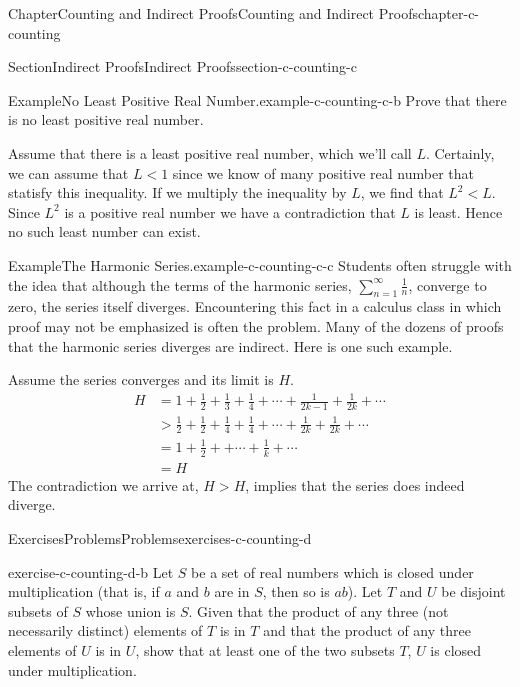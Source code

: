 \documentclass[oneside,10pt,]{book}
\numberwithin{equation}{section}
\newcommand{\lt}{<}
\newcommand{\gt}{>}
\begin{document}
\begin{chapterptx}{Chapter}{Counting and Indirect Proofs}{}{Counting and Indirect Proofs}{}{}{chapter-c-counting}
\begin{sectionptx}{Section}{Indirect Proofs}{}{Indirect Proofs}{}{}{section-c-counting-c}
\begin{example}{Example}{No Least Positive Real Number.}{example-c-counting-c-b}%
Prove that there is no least positive real number.%
\par
Assume that there is a least positive real number, which we'll call \(L\).  Certainly, we can assume that \(L \lt 1\) since we know of many positive real number that statisfy this inequality.  If we multiply the inequality by \(L\), we find that \(L^2 \lt L\).  Since \(L^2\) is a positive real number we have a contradiction that \(L\) is least.  Hence no such least number can exist.%
\end{example}
\begin{example}{Example}{The Harmonic Series.}{example-c-counting-c-c}%
%
Students often struggle with the idea that although the terms of the harmonic series, \(\sum_{n=1}^{\infty} \frac{1}{n}\), converge to zero, the series itself diverges. Encountering this fact in a calculus class in which proof may not be emphasized is often the problem.  Many of the dozens of proofs that the harmonic series diverges are indirect.  Here is one such example.%
\par
Assume the series converges and its limit is \(H\).%
\begin{equation*}
\begin{split}
H &= 1 + \frac{1}{2} + \frac{1}{3} + \frac{1}{4} +\cdots + \frac{1}{2k-1} + \frac{1}{2k} + \cdots\\
& \gt  \frac{1}{2} + \frac{1}{2} + \frac{1}{4} + \frac{1}{4} +\cdots + \frac{1}{2k} + \frac{1}{2k} + \cdots\\
& = 1 + \frac{1}{2} +  +\cdots + \frac{1}{k}  + \cdots\\
& = H
\end{split}
\end{equation*}
The contradiction we arrive at, \(H \gt H\), implies that the series does indeed diverge.%
\end{example}
\end{sectionptx}
%
%
\typeout{************************************************}
\typeout{************************************************}
%
\begin{exercises-section}{Exercises}{Problems}{}{Problems}{}{}{exercises-c-counting-d}
\begin{divisionexercise}{1}{}{}{exercise-c-counting-d-b}%
Let \(S\) be a set of real numbers which is closed under multiplication (that is, if \(a\) and \(b\) are in \(S\), then so is \(a b\)). Let \(T\) and \(U\) be disjoint subsets of \(S\) whose union is \(S\). Given that the product of any three (not necessarily distinct) elements of \(T\) is in \(T\) and that the product of any three elements of \(U\) is in \(U\), show that at least one of the two subsets \(T\), \(U\) is closed under multiplication.%

\end{divisionexercise}
\end{exercises-section}
\end{chapterptx}
\end{document}
